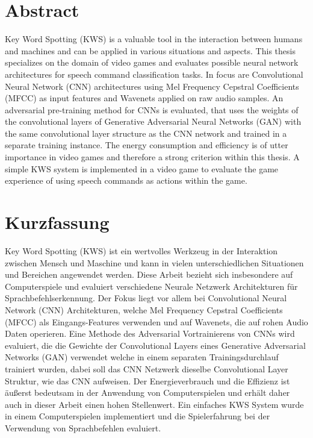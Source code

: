 
\chapter*{Abstract}\label{sec:shards_abstract}
\thesisStateReady
Key Word Spotting (KWS) is a valuable tool in the interaction between humans and machines and can be applied in various situations and aspects.
This thesis specializes on the domain of video games and evaluates possible neural network architectures for speech command classification tasks.
In focus are Convolutional Neural Network (CNN) architectures using Mel Frequency Cepstral Coefficients (MFCC) as input features and Wavenets applied on raw audio samples.
An adversarial pre-training method for CNNs is evaluated, that uses the weights of the convolutional layers of Generative Adversarial Neural Networks (GAN) with the same convolutional layer structure as the CNN network and trained in a separate training instance.
The energy consumption and efficiency is of utter importance in video games and therefore a strong criterion within this thesis.
A simple KWS system is implemented in a video game to evaluate the game experience of using speech commands as actions within the game.



\chapter*{Kurzfassung}
\thesisStateReady
Key Word Spotting (KWS) ist ein wertvolles Werkzeug in der Interaktion zwischen Mensch und Maschine und kann in vielen unterschiedlichen Situationen und Bereichen angewendet werden.
Diese Arbeit bezieht sich insbesondere auf Computerspiele und evaluiert verschiedene Neurale Netzwerk Architekturen für Sprachbefehlserkennung.
Der Fokus liegt vor allem bei Convolutional Neural Network (CNN) Architekturen, welche Mel Frequency Cepstral Coefficients (MFCC) als Eingangs-Features verwenden und auf Wavenets, die auf rohen Audio Daten operieren.
Eine Methode des Adversarial Vortrainierens von CNNs wird evaluiert, die die Gewichte der Convolutional Layers eines Generative Adversarial Networks (GAN) verwendet welche in einem separaten Trainingsdurchlauf trainiert wurden, dabei soll das CNN Netzwerk dieselbe Convolutional Layer Struktur, wie das CNN aufweisen.
Der Energieverbrauch und die Effizienz ist äußerst bedeutsam in der Anwendung von Computerspielen und erhält daher auch in dieser Arbeit einen hohen Stellenwert.
Ein einfaches KWS System wurde in einem Computerspielen implementiert und die Spielerfahrung bei der Verwendung von Sprachbefehlen evaluiert.